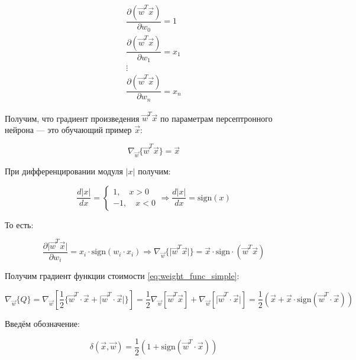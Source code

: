 \documentclass[a4paper]{article}
\numberwithin{equation}{subsection}
\begin{document}
\begin{align*}
    \dfrac{\partial \left( \vec{w}^T \vec{x} \right)}{\partial w_0} = 1 \\
    \dfrac{\partial \left( \vec{w}^T \vec{x} \right)}{\partial w_1} = x_1 \\
    \vdots \\
    \dfrac{\partial \left( \vec{w}^T \vec{x} \right)}{\partial w_n} = x_n
\end{align*}

Получим, что градиент произведения $\vec{w}^T \vec{x}$ по параметрам персептронного
нейрона --- это обучающий пример $\vec{x}$:

\begin{equation}
    \nabla_{\vec{w}} \{\vec{w}^T \vec{x} \} = \vec{x}
\end{equation}

При дифференцировании модуля $\lvert x \rvert$ получим:

\begin{equation}
    \dfrac{d\lvert x \rvert}{dx} =
    \begin{cases}
        1, \quad x>0 \\
        -1, \quad x<0
    \end{cases}
    \Rightarrow \dfrac{d\lvert x \rvert}{dx} = \mathrm{sign} (x)
\end{equation}

То есть:

\begin{equation}
    \dfrac{\partial \lvert \vec{w}^T \vec{x} \rvert}{\partial w_i} = x_i \cdot \mathrm{sign} (w_i \cdot x_i)
    \Rightarrow \nabla_{\vec{w}} \{\lvert \vec{w}^T \vec{x} \rvert\} = \vec{x} \cdot \mathrm{sign} \cdot (\vec{w}^T \vec{x})
\end{equation}

Получим градиент функции стоимости \ref{eq:weight_func_simple}:

\begin{equation}
    \nabla_{\vec{w}} \{Q\} = \nabla_{\vec{w}} \left[\dfrac{1}{2} \{ \vec{w}^T \cdot \vec{x} + 
    \lvert \vec{w}^T \cdot \vec{x}  \rvert \} \right] 
    = \dfrac{1}{2}  \nabla_{\vec{w}} \left[ \vec{w}^T \vec{x} \right] + 
    \nabla_{\vec{w}} \left[ \lvert \vec{w}^T \cdot \vec{x}  \rvert \right]
    = \dfrac{1}{2} \left(\vec{x} + \vec{x} \cdot \mathrm{sign} (\vec{w}^T \cdot \vec{x})\right)
\end{equation}

Введём обозначение:

\begin{equation}
    \delta (\vec{x}, \vec{w}) = \dfrac{1}{2} \left( 1 + \mathrm{sign} (\vec{w}^T \cdot \vec{x}) \right)
\end{equation}
\end{document}
